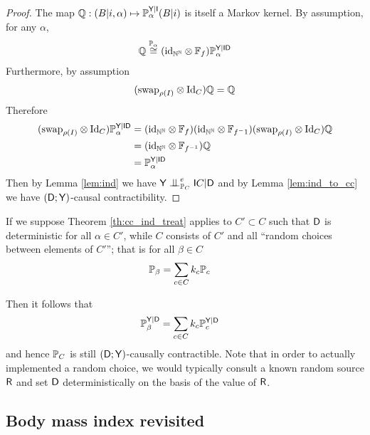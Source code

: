 \begin{proof}
The map $\mathbb{Q}:(B|i,\alpha)\mapsto \mathbb{P}_\alpha^{\mathsf{Y}|\mathsf{I}}(B|i)$ is itself a Markov kernel. By assumption, for any $\alpha$,
\begin{align}
    \mathbb{Q} \overset{\mathbb{P}_\alpha}{\cong} (\text{id}_{\mathbb{N}^\mathbb{N}}\otimes\mathbb{F}_f) \mathbb{P}_\alpha^{\mathsf{Y}|\mathsf{ID}}
\end{align}
Furthermore, by assumption
\begin{align}
    (\text{swap}_{\rho(I)}\otimes \text{Id}_{C} )\mathbb{Q} = \mathbb{Q}
\end{align}
Therefore
\begin{align}
    (\text{swap}_{\rho(I)}\otimes \text{Id}_{C} ) \mathbb{P}_\alpha^{\mathsf{Y}|\mathsf{ID}}&= (\text{id}_{\mathbb{N}^\mathbb{N}}\otimes\mathbb{F}_{f})(\text{id}_{\mathbb{N}^\mathbb{N}}\otimes\mathbb{F}_{f^-1})(\text{swap}_{\rho(I)}\otimes \text{Id}_{C} ) \mathbb{Q}\\
     &= (\text{id}_{\mathbb{N}^\mathbb{N}}\otimes\mathbb{F}_{f^{-1}}) \mathbb{Q}\\
     &= \mathbb{P}_\alpha^{\mathsf{Y}|\mathsf{ID}}
\end{align}
Then by Lemma \ref{lem:ind} we have $\RV{Y}\CI_{\prob{P}_C}^e \RV{I}C|\RV{D}$ and by Lemma \ref{lem:ind_to_cc} we have $(\mathsf{D};\mathsf{Y})$-causal contractibility.
\end{proof}

If we suppose Theorem \ref{th:cc_ind_treat} applies to $C'\subset C$ such that $\mathsf{D}$ is deterministic for all $\alpha\in C'$, while $C$ consists of $C'$ and all ``random choices between elements of $C'$''; that is for all $\beta\in C$
\begin{align}
    \mathbb{P}_\beta &= \sum_{c\in C} k_c \mathbb{P}_c 
\end{align} 

Then it follows that
\begin{align}
    \mathbb{P}_\beta^{\mathsf{Y}|\mathsf{D}} &= \sum_{c\in C} k_c \mathbb{P}_c^{\mathsf{Y}|\mathsf{D}}
\end{align}
and hence $\mathbb{P}_C$ is still $(\mathsf{D};\mathsf{Y})$-causally contractible. Note that in order to actually implemented a random choice, we would typically consult a known random source $\mathsf{R}$ and set $\mathsf{D}$ deterministically on the basis of the value of $\mathsf{R}$.

\subsection{Body mass index revisited}

